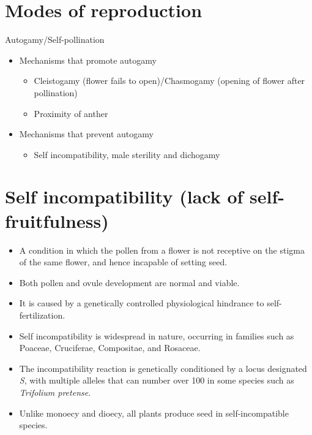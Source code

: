\documentclass[11pt,ignorenonframetext,aspectratio=169]{beamer}
\providecommand{\tightlist}{%
  \setlength{\itemsep}{0pt}\setlength{\parskip}{0pt}}
\begin{document}
\hypertarget{modes-of-reproduction}{%
\section{Modes of reproduction}\label{modes-of-reproduction}}

\begin{frame}{Autogamy/Self-pollination}
\protect\hypertarget{autogamyself-pollination}{}
\begin{itemize}
\tightlist
\item
  Mechanisms that promote autogamy

  \begin{itemize}
  \tightlist
  \item
    Cleistogamy (flower fails to open)/Chasmogamy (opening of flower
    after pollination)
  \item
    Proximity of anther
  \end{itemize}
\item
  Mechanisms that prevent autogamy

  \begin{itemize}
  \tightlist
  \item
    Self incompatibility, male sterility and dichogamy
  \end{itemize}
\end{itemize}
\end{frame}

\hypertarget{self-incompatibility-lack-of-self-fruitfulness}{%
\section{Self incompatibility (lack of
self-fruitfulness)}\label{self-incompatibility-lack-of-self-fruitfulness}}

\begin{frame}{}
\protect\hypertarget{section-4}{}
\begin{itemize}
\tightlist
\item
  A condition in which the pollen from a flower is not receptive on the
  stigma of the same flower, and hence incapable of setting seed.
\item
  Both pollen and ovule development are normal and viable.
\item
  It is caused by a genetically controlled physiological hindrance to
  self-fertilization.
\item
  Self incompatibility is widespread in nature, occurring in families
  such as Poaceae, Cruciferae, Compositae, and Rosaceae.
\item
  The incompatibility reaction is genetically conditioned by a locus
  designated \emph{S}, with multiple alleles that can number over 100 in
  some species such as \emph{Trifolium pretense}.
\item
  Unlike monoecy and dioecy, all plants produce seed in
  self-incompatible species.
\end{itemize}
\end{frame}
\end{document}
